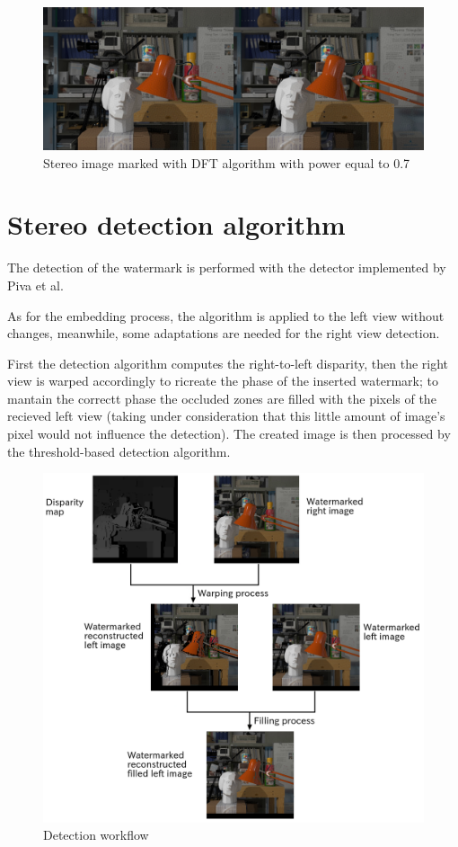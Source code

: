 \begin{figure}[h!]
\centering
\includegraphics[width=1\textwidth]{./img/marked_07_DFT.png}
\caption{\small{Stereo image marked with DFT algorithm with power equal to 0.7}}
\label{fig:dft07}
\end{figure}
\section{Stereo detection algorithm}

The detection of the watermark is performed with the detector implemented by Piva et al.\newline

As for the embedding process, the algorithm is applied to the left view without changes, meanwhile, some adaptations are needed for the right view detection.\newline

First the detection algorithm computes the right-to-left disparity, then the right view is warped accordingly to ricreate the phase of the inserted watermark; to mantain the correctt phase the occluded zones are filled with the pixels of the recieved left view (taking under consideration that this little amount of image's pixel would not influence the detection).\newline
The created image is then processed by the threshold-based detection algorithm.\newline 

\begin{figure}[h!]
\centering
\includegraphics[width=1\textwidth]{./img/detection_workflow.png}
\caption{\small{Detection workflow}}
\label{fig:detflow}
\end{figure}

